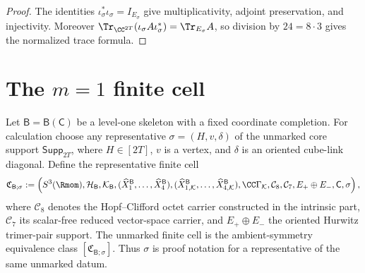 \documentclass[11pt]{article}
\begin{document}
\begin{proof}
The identities \(\iota_\sigma^*\iota_\sigma=I_{E_\sigma}\) give
multiplicativity, adjoint preservation, and injectivity.  Moreover
\(\Tr_{\CC^{2T}}(\iota_\sigma A\iota_\sigma^*)=\Tr_{E_\sigma}A\), so division
by \(24=8\cdot3\) gives the normalized trace formula.
\end{proof}


\section{The \texorpdfstring{\(m=1\)}{m=1} finite cell}
\label{p1:sec:s3one-finite-cell}

\begin{definition}[\(m=1\) finite cell]
\label{p1:def:s3one-finite-cell}
Let \(\mathsf B=\mathsf B(\mathsf C)\) be a level-one skeleton with a fixed
coordinate completion.  For calculation choose any representative
\(\sigma=(H,v,\delta)\) of the unmarked core support
\(\mathsf{Supp}_{2T}\), where \(H\in[2T]\), \(v\) is a vertex, and \(\delta\)
is an oriented cube-link diagonal.  Define the representative finite cell
\[
\mathfrak C_{\mathsf B;\sigma}
:=
\left(
S^3(\Rmom),
\mathcal H_{\mathsf B},
\mathcal K_{\mathsf B},
(\widehat X^{\mathsf B}_1,\ldots,\widehat X^{\mathsf B}_4),
(\widehat X^{\mathsf B}_{1,\mathcal K},\ldots,\widehat X^{\mathsf B}_{4,\mathcal K}),
\CC\Gamma_{\mathcal K},
\mathcal C_8,
\mathcal C_7,
E_+\oplus E_-,
\mathsf C,
\sigma
\right),
\]
where \(\mathcal C_8\) denotes the Hopf--Clifford octet carrier constructed in
the intrinsic part, \(\mathcal C_7\) its scalar-free reduced vector-space
carrier, and \(E_+\oplus E_-\) the oriented Hurwitz trimer-pair support.  The
unmarked finite cell is the ambient-symmetry equivalence class
\([\mathfrak C_{\mathsf B;\sigma}]\).  Thus \(\sigma\) is proof notation for a
representative of the same unmarked datum.
\end{definition}
\end{document}
